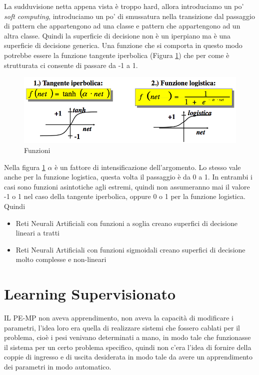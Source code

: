 \noindent La sudduvisione netta appena vista è troppo hard, allora introduciamo un po' \emph{soft computing}, introduciamo un po' di smussatura nella transizione dal passaggio di pattern che appartengono ad una classe e pattern che appartengono ad un altra classe.  Quindi la superficie di decisione non è un iperpiano ma è una superficie di decisione generica. Una funzione che si comporta in questo modo potrebbe essere la funzione tangente iperbolica (Figura \ref{funzioni}) che per come è strutturata ci consente di passare da -1 a 1.
\begin{figure}
\centering
\includegraphics[scale=0.6]{img/funzioni.png}
\caption{Funzioni}
\label{funzioni}
\end{figure}
Nella figura \ref{funzioni} $\alpha$ è un fattore di intensificazione dell'argomento. Lo stesso vale anche per la funzione logistica, questa volta il passaggio è da 0 a 1. In entrambi i casi sono funzioni asintotiche  agli estremi, quindi non assumeranno mai il valore -1 o 1 nel caso della tangente iperbolica, oppure 0 o 1 per la funzione logistica. Quindi
\begin{itemize}
\item Reti Neurali Artificiali con funzioni a soglia creano superfici di decisione lineari a tratti
\item Reti Neurali Artificiali con funzioni sigmoidali creano superfici di decisione molto complesse e non-lineari
\end{itemize}

\section{Learning Supervisionato}
IL PE-MP non aveva apprendimento, non aveva la capacità di modificare i parametri, l'idea loro era quella di realizzare sistemi che fossero cablati per il problema, cioè i pesi venivano determinati a mano, in modo tale che funzionasse il sistema per un certo problema specifico, quindi non c'era l'idea di fornire della coppie di ingresso e di uscita desiderata in modo tale da avere un apprendimento dei parametri in modo automatico. 

